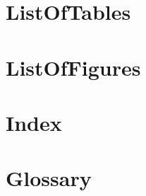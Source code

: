 \documentclass{book}    %
\begin{document}
\iflatexml
\else
 \dominitoc %
\fi
\frontmatter
    
\mainmatter
\tableofcontents
	
	
%
	
	
	
	
	
		
		
	
		
%
		

\pagebreak
\backmatter
\vfill
\pagebreak
\iflatexml
\chapter*{ListOfTables\label{Ch:ListOfTables}}
\else
\fi
{} 

\listoftables
\vfill

\pagebreak
\iflatexml
\chapter*{ListOfFigures\label{Ch:ListOfFigures}}
\else
\fi
{} 
\listoffigures
\vfill
\pagebreak

\iflatexml
\chapter*{Index\label{Ch:Index}}\label{index}\label{Index}

\else
\fi
{} 
\printindex
\vfill

\pagebreak
\chapter*{Glossary\label{Ch:Glossary}}
{} 
 \printglossaries
 
 \vfill

\pagebreak



%

 
\end{document}
